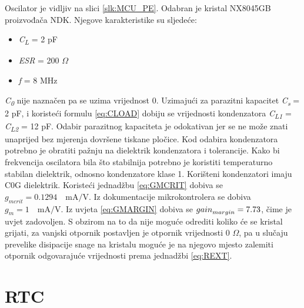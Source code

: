 Oscilator je vidljiv na slici \ref{slk:MCU_PE}. Odabran je kristal NX8045GB proizvođača NDK. Njegove karakteristike su sljedeće:
\begin{itemize}
    \item \textit{C\textsubscript{L}} = 2 pF
    \item \textit{ESR} = 200 $\Omega$
    \item \textit{f} = 8 MHz
\end{itemize}
\textit{C\textsubscript{0}} nije naznačen pa se uzima vrijednost 0. Uzimajući za parazitni kapacitet \textit{C\textsubscript{s}} = 2 pF, i koristeći formulu \ref{eq:CLOAD} dobiju se vrijednosti kondenzatora \textit{C\textsubscript{L1}} = \textit{C\textsubscript{L2}} = 12 pF. Odabir parazitnog kapaciteta je odokativan jer se ne može znati unaprijed bez mjerenja dovršene tiskane pločice. Kod odabira kondenzatora potrebno je obratiti pažnju na dielektrik kondenzatora i tolerancije. Kako bi frekvencija oscilatora bila što stabilnija potrebno je koristiti temperaturno stabilan dielektrik, odnosno kondenzatore klase 1. Korišteni kondenzatori imaju C0G dielektrik. Koristeći jednadžbu \ref{eq:GMCRIT} dobiva se ${g_{mcrit} = 0.1294 \quad \textrm{mA/V}}$. Iz dokumentacije mikrokontrolera se dobiva ${g_m = 1\quad \textrm{mA/V}}$. Iz uvjeta \ref{eq:GMARGIN} dobiva se ${{gain}_{margin}=\nolinebreak 7.73}$, čime je uvjet zadovoljen. S obzirom na to da nije moguće odrediti koliko će se kristal grijati, za vanjski otpornik postavljen je otpornik vrijednosti 0 $\Omega$, pa u slučaju prevelike disipacije snage na kristalu moguće je na njegovo mjesto zalemiti otpornik odgovarajuće vrijednosti prema jednadžbi \ref{eq:REXT}.

\section{RTC}

